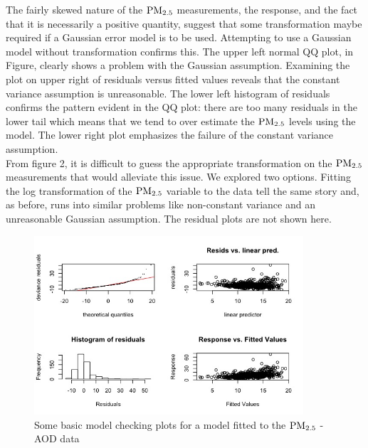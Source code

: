 \documentclass[10pt]{article}
\begin{document}
\begin{itemize}
The fairly skewed nature of the ${\mathrm{PM_{2.5}}}$ measurements, the response, and the fact that it is necessarily a positive quantity, suggest that some transformation maybe required if a Gaussian error model is to be used. Attempting to use a Gaussian model without transformation confirms this. The upper left normal QQ plot, in Figure, clearly shows a problem with the Gaussian assumption. Examining the plot on upper right of residuals versus fitted values reveals that the constant variance assumption is unreasonable. The lower left histogram of residuals confirms the pattern evident in the QQ plot: there are too many residuals in the lower tail which means that we tend to over estimate the ${\mathrm{PM_{2.5}}}$ levels using the model. The lower right plot emphasizes the failure of the constant variance assumption. \\ From figure 2, it is difficult to guess the appropriate transformation on the ${\mathrm{PM_{2.5}}}$ measurements that would alleviate this issue. We explored two options. Fitting the log transformation of the ${\mathrm{PM_{2.5}}}$ variable to the data tell the same story and, as before, runs into similar problems like non-constant variance and an unreasonable Gaussian assumption. The residual plots are not shown here. \newpage

\begin{figure}[h]
\centering
\includegraphics[width = 100mm]{gauss_diag.jpeg} 
\caption{Some basic model checking plots for a model fitted to the ${\mathrm{PM_{2.5}}}$ - AOD data} 
\end{figure}


\end{itemize}
\end{document}
